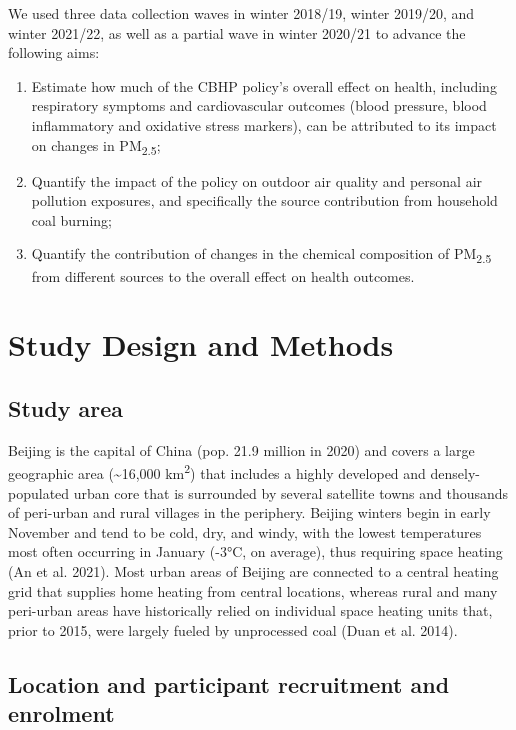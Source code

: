 \documentclass[
  letterpaper,
  DIV=11,
  numbers=noendperiod]{scrartcl}
\begin{document}
We used three data collection waves in winter 2018/19, winter 2019/20,
and winter 2021/22, as well as a partial wave in winter 2020/21 to
advance the following aims:

\begin{enumerate}
\def\labelenumi{\arabic{enumi}.}
\item
  Estimate how much of the CBHP policy's overall effect on health,
  including respiratory symptoms and cardiovascular outcomes (blood
  pressure, blood inflammatory and oxidative stress markers), can be
  attributed to its impact on changes in PM\textsubscript{2.5};
\item
  Quantify the impact of the policy on outdoor air quality and personal
  air pollution exposures, and specifically the source contribution from
  household coal burning;
\item
  Quantify the contribution of changes in the chemical composition of
  PM\textsubscript{2.5} from different sources to the overall effect on
  health outcomes.
\end{enumerate}

\hypertarget{study-design-and-methods}{%
\section{Study Design and Methods}\label{study-design-and-methods}}

\hypertarget{study-area}{%
\subsection{Study area}\label{study-area}}

Beijing is the capital of China (pop. 21.9 million in 2020) and covers a
large geographic area (\textasciitilde16,000 km\textsuperscript{2}) that
includes a highly developed and densely-populated urban core that is
surrounded by several satellite towns and thousands of peri-urban and
rural villages in the periphery. Beijing winters begin in early November
and tend to be cold, dry, and windy, with the lowest temperatures most
often occurring in January (-3°C, on average), thus requiring space
heating (An et al. 2021). Most urban areas of Beijing are connected to a
central heating grid that supplies home heating from central locations,
whereas rural and many peri-urban areas have historically relied on
individual space heating units that, prior to 2015, were largely fueled
by unprocessed coal (Duan et al. 2014).

\hypertarget{location-and-participant-recruitment-and-enrolment}{%
\subsection{Location and participant recruitment and
enrolment}\label{location-and-participant-recruitment-and-enrolment}}
\end{document}
